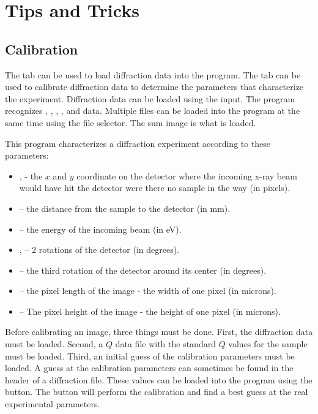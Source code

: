 \chapter{Tips and Tricks}

\section{Calibration}

The  tab can be used to load
diffraction data into the program. The tab can
be used to calibrate diffraction data to determine the 
parameters that characterize the experiment. 
Diffraction data can be loaded using the  input. 
The program recognizes , , 
, , and  data. 
Multiple files can be loaded into the program at the same
time using the file selector. The sum image is what is loaded.

This program characterizes a diffraction experiment 
according to these parameters:
\index{$\alpha$}
\index{$\beta$}
\begin{itemize}
    \item {},  - the $x$ 
and $y$ coordinate on the detector where the incoming 
x-ray beam would have hit the detector were there 
no sample in the way (in pixels).
    \item {} -- the distance from the sample to 
    the detector (in mm).
    \item {} -- the energy of the incoming beam (in eV).
    \item {},  -- 2 rotations of 
    the detector (in degrees).
    \item {} -- the third rotation of the detector 
    around its center (in degrees).
    \item {} -- the pixel length of the image - 
    the width of one pixel (in microns).
    \item {} -- The pixel height of the image -
    the height of one pixel (in microns).
\end{itemize}
Before calibrating an image, three things must be done. 
First, the diffraction data must be loaded.
Second, a $Q$ data file with the standard $Q$ values for the
sample must be loaded.
Third, an initial guess of the calibration parameters must be
loaded. A guess at the calibration parameters can sometimes
be found in the header of a diffraction file. These values
can be loaded into the program using the  
button.  The  button will perform the calibration 
and find a best guess at the real experimental parameters.

